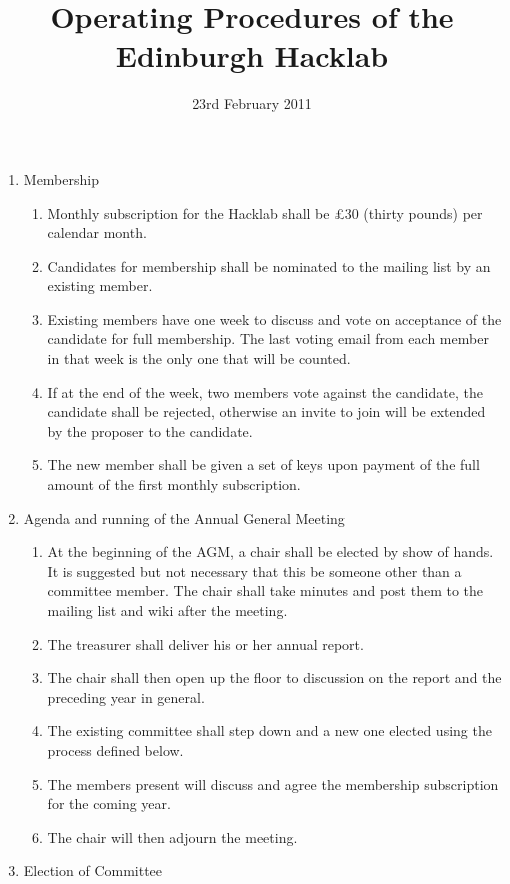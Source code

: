 \documentclass{article}
\title{Operating Procedures of the Edinburgh Hacklab}
\date{23rd February 2011}
\begin{document}
\maketitle
\begin{enumerate}
\item Membership
  \begin{enumerate}
  \item Monthly subscription for the Hacklab shall be \pounds 30
    (thirty pounds) per calendar month.
  \item Candidates for membership shall be nominated to the mailing
    list by an existing member.
  \item Existing members have one week to discuss and vote on
    acceptance of the candidate for full membership. The last voting
    email from each member in that week is the only one that will be
    counted.
  \item \cbstart If at the end of the week, two members vote against the
    candidate, the candidate shall be rejected, otherwise an invite to
    join will be extended by the proposer to the candidate.\cbend
  \item The new member shall be given a set of keys upon payment of
    the full amount of the first monthly subscription.
  \end{enumerate} %
\item Agenda and running of the Annual General Meeting
  \begin{enumerate}
  \item At the beginning of the AGM, a chair shall be elected by show
    of hands. It is suggested but not necessary that this be someone
    other than a committee member. The chair shall take minutes and
    post them to the mailing list and wiki after the meeting.
  \item The treasurer shall deliver his or her annual report.
  \item The chair shall then open up the floor to discussion on the
    report and the preceding year in general.
  \item The existing committee shall step down and a new one elected
    using the process defined below.
  \item The members present will discuss and agree the membership
    subscription for the coming year.
  \item The chair will then adjourn the meeting.
  \end{enumerate}
\item Election of Committee
  \begin{enumerate}

\end{enumerate}
\end{enumerate}
\end{document}
